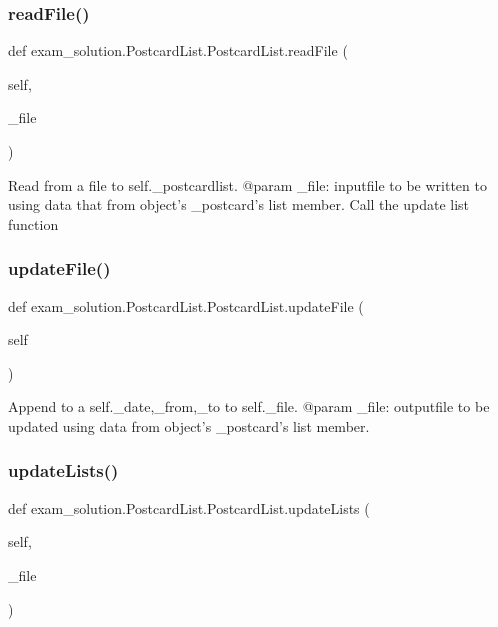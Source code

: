 \subsubsection{\texorpdfstring{readFile()}{readFile()}}
{\footnotesize\ttfamily def exam\+\_\+solution.\+Postcard\+List.\+Postcard\+List.\+read\+File (\begin{DoxyParamCaption}\item[{}]{self,  }\item[{}]{\+\_\+file }\end{DoxyParamCaption})}

\begin{DoxyVerb}Read from a file to self._postcardlist.
@param _file: inputfile to be written to using data that from
object's _postcard's list member. Call the update list function
\end{DoxyVerb}
 \mbox{\label{classexam__solution_1_1PostcardList_1_1PostcardList_ad7a33de753fb6551b71308119da12c64}} 
\subsubsection{\texorpdfstring{updateFile()}{updateFile()}}
{\footnotesize\ttfamily def exam\+\_\+solution.\+Postcard\+List.\+Postcard\+List.\+update\+File (\begin{DoxyParamCaption}\item[{}]{self }\end{DoxyParamCaption})}

\begin{DoxyVerb}Append to a self.{_date,_from,_to} to self._file.
@param _file: outputfile to be updated using data from
object's _postcard's list member.
\end{DoxyVerb}
 \mbox{\label{classexam__solution_1_1PostcardList_1_1PostcardList_a65f45ac00037f579570663953956f5f0}} 
\subsubsection{\texorpdfstring{updateLists()}{updateLists()}}
{\footnotesize\ttfamily def exam\+\_\+solution.\+Postcard\+List.\+Postcard\+List.\+update\+Lists (\begin{DoxyParamCaption}\item[{}]{self,  }\item[{}]{\+\_\+file }\end{DoxyParamCaption})}

